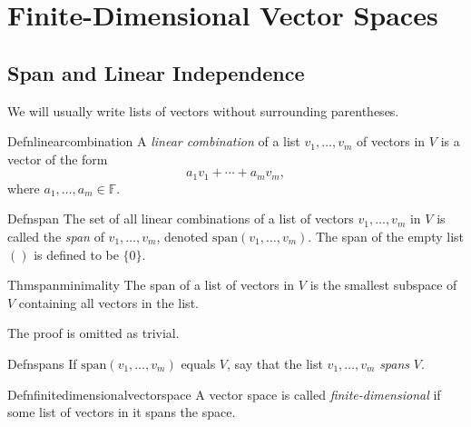 \chapter{Finite-Dimensional Vector Spaces}

\section{Span and Linear Independence}

We will usually write lists of vectors without surrounding parentheses.

\begin{reference}{Defn}{linearcombination}
  A \textit{linear combination} of a list $v_1,\dots,v_m$ of vectors in $V$ is a vector of the form
  \[
    a_1v_1+\cdots+a_mv_m,
  \]
  where $a_1,\dots,a_m\in \mathbb F$.
\end{reference}

\begin{reference}{Defn}{span}
  The set of all linear combinations of a list of vectors $v_1,\dots,v_m$ in $V$ is called the \textit{span} of $v_1,\dots,v_m$, denoted $\mathrm{span}(v_1,\dots,v_m)$. The span of the empty list $()$ is defined to be $\{0\}$.
\end{reference}

\begin{reference}{Thm}{spanminimality}
  The span of a list of vectors in $V$ is the smallest subspace of $V$ containing all vectors in the list.
\end{reference}

The proof is omitted as trivial.

\begin{reference}{Defn}{spans}
  If $\mathrm{span}(v_1,\dots,v_m)$ equals $V$, say that the list $v_1,\dots,v_m$ \textit{spans} $V$.
\end{reference}

\begin{reference}{Defn}{finitedimensionalvectorspace}
  A vector space is called \textit{finite-dimensional} if some list of vectors in it spans the space.
\end{reference}
